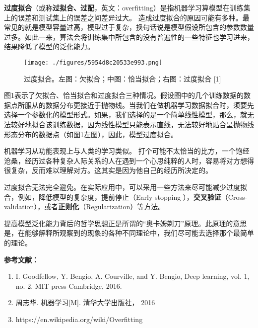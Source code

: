 
\textbf{过度拟合}（或称\textbf{过拟合、过配}，英文：overfitting）是指机器学习算模型在训练集上的误差和测试集上的误差之间差异过大。
造成过度拟合的原因可能有多种。最常见的就是模型容量过高，模型过于复杂，换句话说是模型假设所包含的参数数量过多。如此一来，算法会将训练集中所包含的没有普遍性的一些特征也学习进来，结果降低了模型的泛化能力。

\begin{figure}[ht]
\centering
\texttt{[image: ./figures/5954d8c20533e993.png]}
\caption{过度拟合。左图：欠拟合；中图：恰当拟合；右图：过度拟合 [1]} \label{fig_ovfit_1}
\end{figure}

图1表示了欠拟合、恰当拟合和过度拟合三种情况。假设图中的几个训练数据的数据点所服从的数据分布更接近于抛物线。当我们在做机器学习数据拟合时，须要先选择一个参数化的模型形式。如果，我们选择的是一个简单线性模型，那么，就无法较好地拟合该训练数据，因为线性模型只能表示直线，无法较好地贴合呈抛物线形态分布的数据点（如图1左图），因此，模型过度拟合。

机器学习从功能表现上与人类的学习类似。
打个可能不太恰当的比方，一个饱经沧桑，经历过各种复杂人际关系的人在遇到一个心思纯粹的人时，容易将对方想得很复杂，反而难以理解对方。这其实是因为他自己的经历所决定的。

过度拟合无法完全避免。在实际应用中，可以采用一些方法来尽可能减少过度拟合，例如，降低模型的复杂度，提前停止（Early stopping
），\textbf{交叉验证}（Cross-validation），或者\textbf{正则化}（Regularization）等方法。

提高模型泛化能力背后的哲学思想正是所谓的“奥卡姆剃刀”原理。此原理的意思是，在能够解释所观察到的现象的各种不同理论中，我们尽可能去选择那个最简单的理论。



\textbf{参考文献：}
\begin{enumerate}
\item I. Goodfellow, Y. Bengio, A. Courville, and Y. Bengio, Deep learning, vol. 1, no. 2. MIT press Cambridge, 2016.
\item 周志华. 机器学习[M]. 清华大学出版社， 2016
\item https://en.wikipedia.org/wiki/Overfitting
\end{enumerate}
